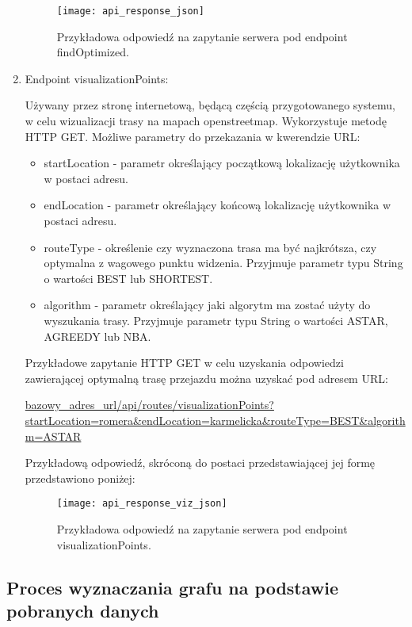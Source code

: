 \begin{enumerate}
\begin{figure}[H]
\centering
\texttt{[image: api\_response\_json]}
\caption{Przykładowa odpowiedź na zapytanie serwera pod endpoint findOptimized.}
\end{figure}

\item Endpoint visualizationPoints:

Używany przez stronę internetową, będącą częścią przygotowanego systemu, w celu wizualizacji trasy na mapach openstreetmap. Wykorzystuje metodę HTTP GET. Możliwe parametry do przekazania w kwerendzie URL:

\begin{itemize}
\item startLocation - parametr określający początkową lokalizację użytkownika w postaci adresu.
\item endLocation - parametr określający końcową lokalizację użytkownika w postaci adresu.
\item routeType - określenie czy wyznaczona trasa ma być najkrótsza, czy optymalna z wagowego punktu widzenia. Przyjmuje parametr typu String o wartości BEST lub SHORTEST.
\item algorithm - parametr określający jaki algorytm ma zostać użyty do wyszukania trasy. Przyjmuje parametr typu String o wartości ASTAR, AGREEDY lub NBA.
\end{itemize}

Przykładowe zapytanie HTTP GET w celu uzyskania odpowiedzi zawierającej optymalną trasę przejazdu można uzyskać pod adresem URL:

\url{bazowy_adres_url/api/routes/visualizationPoints?startLocation=romera&endLocation=karmelicka&routeType=BEST&algorithm=ASTAR}

Przykładową odpowiedź, skróconą do postaci przedstawiającej jej formę przedstawiono poniżej:

\begin{figure}[H]
\centering
\texttt{[image: api\_response\_viz\_json]}
\caption{Przykładowa odpowiedź na zapytanie serwera pod endpoint visualizationPoints.}
\end{figure}

\end{enumerate}

\subsection{Proces wyznaczania grafu na podstawie pobranych danych}

